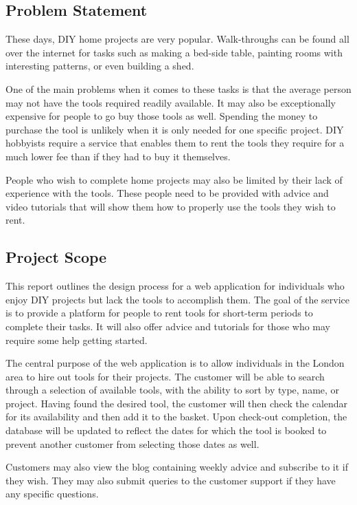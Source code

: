 \hypertarget{problem-statement}{%
\subsection{Problem Statement}\label{problem-statement}}

These days, DIY home projects are very popular. Walk-throughs can be
found all over the internet for tasks such as making a bed-side table,
painting rooms with interesting patterns, or even building a shed.

One of the main problems when it comes to these tasks is that the
average person may not have the tools required readily available. It may
also be exceptionally expensive for people to go buy those tools as
well. Spending the money to purchase the tool is unlikely when it is
only needed for one specific project. DIY hobbyists require a service
that enables them to rent the tools they require for a much lower fee
than if they had to buy it themselves.

People who wish to complete home projects may also be limited by their
lack of experience with the tools. These people need to be provided with
advice and video tutorials that will show them how to properly use the
tools they wish to rent.

\hypertarget{project-scope}{%
\subsection{Project Scope}\label{project-scope}}

This report outlines the design process for a web application for
individuals who enjoy DIY projects but lack the tools to accomplish
them. The goal of the service is to provide a platform for people to
rent tools for short-term periods to complete their tasks. It will also
offer advice and tutorials for those who may require some help getting
started.

The central purpose of the web application is to allow individuals in
the London area to hire out tools for their projects. The customer will
be able to search through a selection of available tools, with the
ability to sort by type, name, or project. Having found the desired
tool, the customer will then check the calendar for its availability and
then add it to the basket. Upon check-out completion, the database will
be updated to reflect the dates for which the tool is booked to prevent
another customer from selecting those dates as well.

Customers may also view the blog containing weekly advice and subscribe
to it if they wish. They may also submit queries to the customer support
if they have any specific questions.

